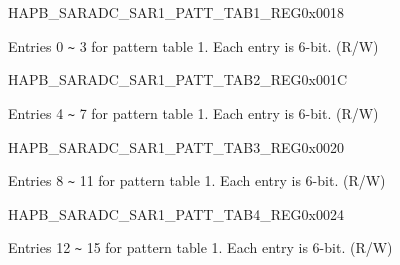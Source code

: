 \begin{register}{H}{APB\_SARADC\_SAR1\_PATT\_TAB1\_REG}{0x{}0018}\label{regdesc:APBSARADCSAR1PATTTAB1REG}
%
%
\regnewline%
\begin{regdesc}\begin{reglist}
\label{fielddesc:APBSARADCSAR1PATTTAB1}\item [APB\_SARADC\_SAR1\_PATT\_TAB1] Entries 0 \verb+~+ 3 for pattern table 1. Each entry is 6-bit. (R/W)
\end{reglist}\end{regdesc}
\end{register}


\begin{register}{H}{APB\_SARADC\_SAR1\_PATT\_TAB2\_REG}{0x{}001C}\label{regdesc:APBSARADCSAR1PATTTAB2REG}
%
%
\regnewline%
\begin{regdesc}\begin{reglist}
\label{fielddesc:APBSARADCSAR1PATTTAB2}\item [APB\_SARADC\_SAR1\_PATT\_TAB2] Entries 4 \verb+~+ 7 for pattern table 1. Each entry is 6-bit. (R/W)
\end{reglist}\end{regdesc}
\end{register}


\begin{register}{H}{APB\_SARADC\_SAR1\_PATT\_TAB3\_REG}{0x{}0020}\label{regdesc:APBSARADCSAR1PATTTAB3REG}
%
%
\regnewline%
\begin{regdesc}\begin{reglist}
\label{fielddesc:APBSARADCSAR1PATTTAB3}\item [APB\_SARADC\_SAR1\_PATT\_TAB3] Entries 8 \verb+~+ 11 for pattern table 1. Each entry is 6-bit. (R/W)
\end{reglist}\end{regdesc}
\end{register}


\begin{register}{H}{APB\_SARADC\_SAR1\_PATT\_TAB4\_REG}{0x{}0024}\label{regdesc:APBSARADCSAR1PATTTAB4REG}
%
%
\regnewline%
\begin{regdesc}\begin{reglist}
\label{fielddesc:APBSARADCSAR1PATTTAB4}\item [APB\_SARADC\_SAR1\_PATT\_TAB4] Entries 12 \verb+~+ 15 for pattern table 1. Each entry is 6-bit. (R/W)
\end{reglist}\end{regdesc}
\end{register}



